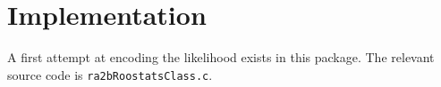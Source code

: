 \documentclass[11pt]{article}
\begin{document}
    

    \section{ Implementation }


     A first attempt at encoding the likelihood exists in this package.
     The relevant source code is {\tt ra2bRoostatsClass.c}.


    
\end{document}
